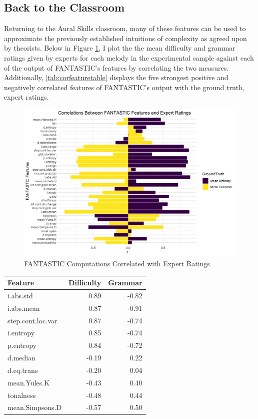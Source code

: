 \documentclass[12pt,]{book}
\begin{document}
\hypertarget{back-to-the-classroom}{%
\subsection{Back to the Classroom}\label{back-to-the-classroom}}

Returning to the Aural Skills classroom, many of these features can be used to approximate the previously established intuitions of complexity as agreed upon by theorists.
Below in Figure \ref{fig:corfeature}, I plot the the mean difficulty and grammar ratings given by experts for each melody in the experimental sample against each of the output of FANTASTIC's features by correlating the two measures.
Additionally, \ref{tab:corfeaturetable} displays the five strongest positive and negatively correlated features of FANTASTIC's output with the ground truth, expert ratings.

\begin{figure}

{\centering \includegraphics[width=1\linewidth]{img/FantasticExpertPlot} 

}

\caption{FANTASTIC Computations Correlated with Expert Ratings}\label{fig:corfeature}
\end{figure}

\begin{longtable}[]{@{}lrr@{}}
\toprule
Feature & Difficulty & Grammar\tabularnewline
\midrule
\endhead
i.abs.std & 0.89 & -0.82\tabularnewline
i.abs.mean & 0.87 & -0.91\tabularnewline
step.cont.loc.var & 0.87 & -0.74\tabularnewline
i.entropy & 0.85 & -0.74\tabularnewline
p.entropy & 0.84 & -0.72\tabularnewline
d.median & -0.19 & 0.22\tabularnewline
d.eq.trans & -0.20 & 0.04\tabularnewline
mean.Yules.K & -0.43 & 0.40\tabularnewline
tonalness & -0.48 & 0.44\tabularnewline
mean.Simpsons.D & -0.57 & 0.50\tabularnewline
\bottomrule
\end{longtable}
\end{document}

